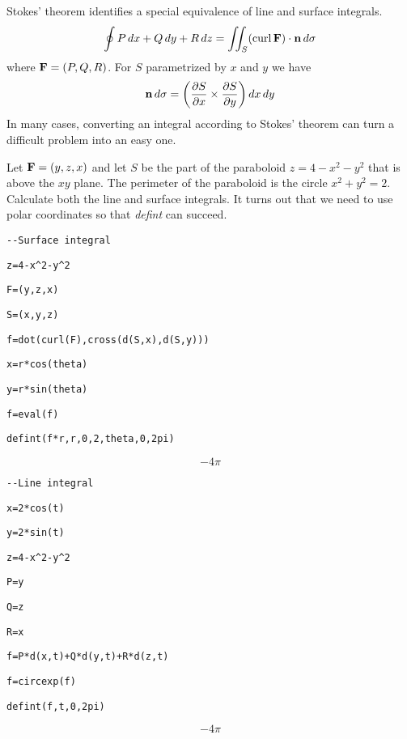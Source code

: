 
\noindent
Stokes' theorem identifies a special equivalence of line and surface
integrals.
%
$$\oint P\,dx+Q\,dy+R\,dz
=\int\!\!\!\int_S(\mathop{\rm curl}{\bf F})\cdot{\bf n}\,d\sigma
$$
where ${\bf F}=(P,Q,R)$.
For $S$ parametrized by $x$ and $y$ we have
$${\bf n}\,d\sigma=\left(
{\partial S\over\partial x}\times{\partial S\over\partial y}
\right)dx\,dy$$
In many cases, converting an integral according to
Stokes' theorem can turn a difficult problem into an easy one.

\medskip
\noindent
Let ${\bf F}=(y,z,x)$ and let $S$ be the part of the paraboloid
$z=4-x^2-y^2$
that is above the $xy$ plane.
The perimeter of the paraboloid is the circle $x^2+y^2=2$.
Calculate both the line and surface integrals.
It turns out that we need to use polar coordinates so that {\it defint} can
succeed.

\medskip
\verb$--Surface integral$

\verb$z=4-x^2-y^2$

\verb$F=(y,z,x)$

\verb$S=(x,y,z)$

\verb$f=dot(curl(F),cross(d(S,x),d(S,y)))$

\verb$x=r*cos(theta)$

\verb$y=r*sin(theta)$

\verb$f=eval(f)$

\verb$defint(f*r,r,0,2,theta,0,2pi)$

$$-4\pi$$

\verb$--Line integral$

\verb$x=2*cos(t)$

\verb$y=2*sin(t)$

\verb$z=4-x^2-y^2$

\verb$P=y$

\verb$Q=z$

\verb$R=x$

\verb$f=P*d(x,t)+Q*d(y,t)+R*d(z,t)$

\verb$f=circexp(f)$

\verb$defint(f,t,0,2pi)$

$$-4\pi$$

